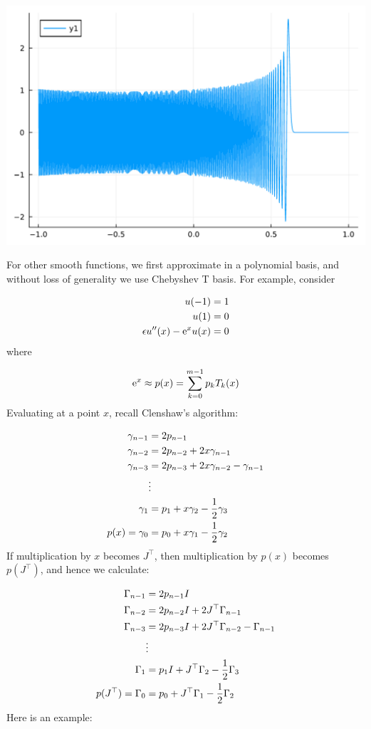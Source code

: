 \documentclass[12pt,a4paper]{article}
\begin{document}
\includegraphics[width=\linewidth]{jl_dOthw0/OP_methods_46_1.pdf}

For other smooth functions, we first approximate in a polynomial basis,  and without loss of generality we use Chebyshev T basis. For example, consider


\begin{align*}
u(-1) &= 1\\
u(1) &= 0\\
\epsilon u''(x) - {\rm e}^x u(x) &= 0
\end{align*}
where

\[
{\rm e}^x  \approx p(x) = \sum_{k=0}^{m-1} p_k T_k(x)
\]
Evaluating at a point $x$, recall Clenshaw's algorithm:


\begin{align*}
\gamma_{n-1} &= 2p_{n-1} \\
\gamma_{n-2} &= 2p_{n-2} + 2x \gamma_{n-1} \\
\gamma_{n-3} &= 2 p_{n-3} + 2x \gamma_{n-2} - \gamma_{n-1} \\
& \vdots \\
\gamma_1 &= p_1 + x \gamma_2 - {1 \over 2} \gamma_3 \\
p(x) = \gamma_0 &= p_0 + x \gamma_1 - {1 \over 2} \gamma_2
\end{align*}
If multiplication by $x$ becomes $J^\top$, then multiplication by $p(x)$ becomes $p(J^\top)$, and hence we calculate:


\begin{align*}
\Gamma_{n-1} &= 2p_{n-1}I \\
\Gamma_{n-2} &= 2p_{n-2}I + 2J^\top \Gamma_{n-1} \\
\Gamma_{n-3} &= 2 p_{n-3}I + 2J^\top \Gamma_{n-2} - \Gamma_{n-1} \\
& \vdots \\
\Gamma_1 &= p_1I + J^\top \Gamma_2 - {1 \over 2} \Gamma_3 \\
p(J^\top) = \Gamma_0 &= p_0 + J^\top \Gamma_1 - {1 \over 2} \Gamma_2
\end{align*}
Here is an example:
\end{document}
